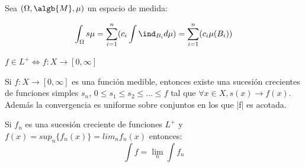 \documentclass{apuntes}
\begin{document}
\begin{defn}
Sea $(\Omega,\algb{M},\mu)$ un espacio de medida:

\[\int_{\Omega} s\mu = \sum_{i=1}^{n}(c_i \int \ind_{B_i} d\mu) = \sum_{i=1}^{n}(c_i \mu(B_i))\]
\end{defn}

\begin{defn}[Función $L^+$]
$f \in L^+ \Leftrightarrow f:X\rightarrow [0, \infty]$
\end{defn}

\begin{defn}
Si $f:X \rightarrow [0, \infty]$ es una función medible, entonces existe una sucesión crecientes de funciones simples $s_n$, $0 \leq s_1 \leq s_2 \leq ... \leq f$ tal que $\forall x  \in X, s(x) \rightarrow f(x)$. Además la convergencia es uniforme sobre conjuntos en los que |f| es acotada.
\end{defn}

\begin{defn}
Si $f_n$ es una sucesión creciente de funciones $L^+$ y $f(x)=sup_n\{f_n(x)\}=lim_nf_n(x)$ entonces:
\[
\int f = \lim_n \int f_n
\]
\end{defn}
\end{document}
